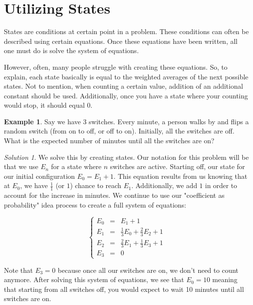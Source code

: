 \documentclass[letterpaper]{article}
\theoremstyle{definition}
\newtheorem{example}[thm]{Example}
\theoremstyle{remark}
\newtheorem*{solution}{Solution}
\theoremstyle{definition}
\begin{document}
\section{Utilizing States}
States are conditions at certain point in a problem. These conditions can often be described using certain equations. Once these equations have been written, all one must do is solve the system of equations.

However, often, many people struggle with creating these equations. So, to explain, each state basically is equal to the weighted averages of the next possible states. Not to mention, when counting a certain value, addition of an additional constant should be used. Additionally, once you have a state where your counting would stop, it should equal 0.

\begin{example}
Say we have 3 switches. Every minute, a person walks by and flips a random switch (from on to off, or off to on). Initially, all the switches are off. What is the expected number of minutes until all the switches are on?
\end{example}

\begin{solution}
We solve this by creating states. Our notation for this problem will be that we use $E_{n}$ for a state where $n$ switches are active. Starting off, our state for our initial configuration $E_{0} = E_{1} + 1$. This equation results from us knowing that at $E_{0}$, we have $\frac{1}{1}$ (or $1$) chance to reach $E_{1}$. Additionally, we add $1$ in order to account for the increase in minutes. We continue to use our "coefficient as probability" idea process to create a full system of equations:

\[ \left\{ 
    \begin{array}{lcl} 
        E_{0} &= &E_{1} + 1\\
        E_{1} &= &\frac{1}{3}E_{0} + \frac{2}{3}E_{2} + 1\\
        E_{2} &= &\frac{2}{3}E_{1} + \frac{1}{3}E_{3} + 1\\
        E_{3} &= &0
\end{array}
\right.\]

Note that $E_{3} = 0$ because once all our switches are on, we don't need to count anymore. After solving this system of equations, we see that $E_{0} = 10$ meaning that starting from all switches off, you would expect to wait 10 minutes until all switches are on. 
\end{solution}
\end{document}
